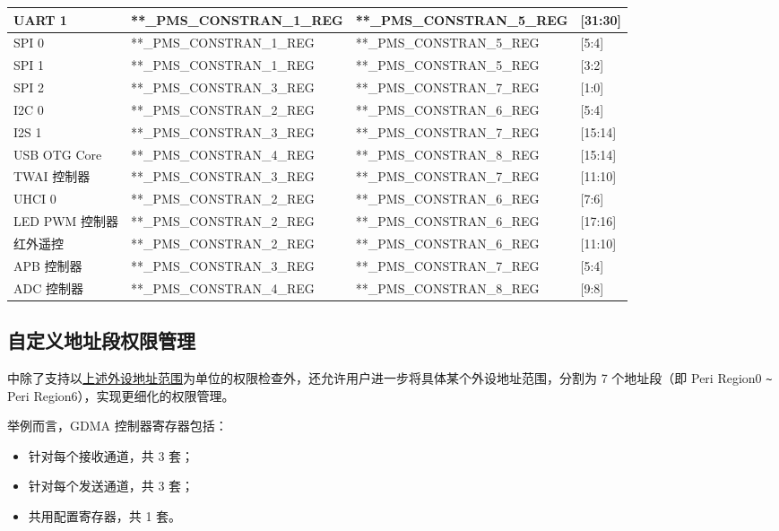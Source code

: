 \documentclass[main\_\_CN.tex]{subfiles}
\begin{document}
\begin{ThreePartTable}
\begin{longtable}[c]{ |l|l|l|l| }
    UART 1 & **\_PMS\_CONSTRAN\_1\_REG & **\_PMS\_CONSTRAN\_5\_REG & [31:30] \\\hline
    SPI 0 & **\_PMS\_CONSTRAN\_1\_REG & **\_PMS\_CONSTRAN\_5\_REG & [5:4] \\\hline
    SPI 1 & **\_PMS\_CONSTRAN\_1\_REG & **\_PMS\_CONSTRAN\_5\_REG & [3:2] \\\hline
    SPI 2 & **\_PMS\_CONSTRAN\_3\_REG & **\_PMS\_CONSTRAN\_7\_REG & [1:0] \\\hline
    I2C 0 & **\_PMS\_CONSTRAN\_2\_REG & **\_PMS\_CONSTRAN\_6\_REG & [5:4] \\\hline
    I2S 1 & **\_PMS\_CONSTRAN\_3\_REG & **\_PMS\_CONSTRAN\_7\_REG & [15:14] \\\hline
    USB OTG Core & **\_PMS\_CONSTRAN\_4\_REG & **\_PMS\_CONSTRAN\_8\_REG & [15:14] \\\hline
    TWAI 控制器 & **\_PMS\_CONSTRAN\_3\_REG & **\_PMS\_CONSTRAN\_7\_REG & [11:10] \\\hline
    UHCI 0  & **\_PMS\_CONSTRAN\_2\_REG & **\_PMS\_CONSTRAN\_6\_REG & [7:6] \\\hline
    LED PWM 控制器  & **\_PMS\_CONSTRAN\_2\_REG & **\_PMS\_CONSTRAN\_6\_REG & [17:16] \\\hline
    红外遥控  & **\_PMS\_CONSTRAN\_2\_REG & **\_PMS\_CONSTRAN\_6\_REG & [11:10] \\\hline
    APB 控制器 & **\_PMS\_CONSTRAN\_3\_REG & **\_PMS\_CONSTRAN\_7\_REG & [5:4] \\\hline
    ADC 控制器 & **\_PMS\_CONSTRAN\_4\_REG & **\_PMS\_CONSTRAN\_8\_REG & [9:8] \\\hline
\end{longtable}
\end{ThreePartTable}


\subsection{自定义地址段权限管理}


\chipname{} 中除了支持以\hyperref[sec:permctrl-peri-address]{上述外设地址范围}为单位的权限检查外，还允许用户进一步将具体某个外设地址范围，分割为 7 个地址段（即 Peri Region0 \verb+~+ Peri Region6），实现更细化的权限管理。

举例而言，GDMA 控制器寄存器包括：
\begin{itemize}
    \item 针对每个接收通道，共 3 套；
    \item 针对每个发送通道，共 3 套；
    \item 共用配置寄存器，共 1 套。
\end{itemize}
\end{document}
